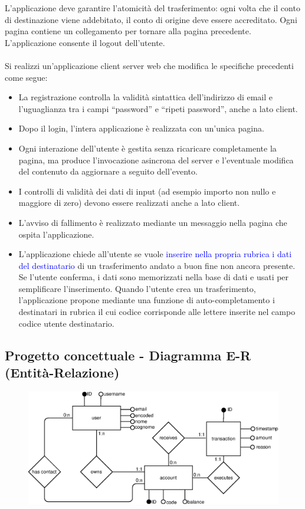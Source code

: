 \documentclass{article}
\begin{document}
L’applicazione deve garantire l’atomicità del trasferimento: ogni volta che il conto di
destinazione viene addebitato, il conto di origine deve essere accreditato. Ogni pagina
contiene un collegamento per tornare alla pagina precedente. L’applicazione consente il
logout dell’utente.
\\
\\
Si realizzi un’applicazione client server web che modifica le specifiche precedenti come segue:
\begin{itemize}
	\item La registrazione controlla la validità sintattica dell’indirizzo di email e l’uguaglianza tra
	i campi “password” e “ripeti password”, anche a lato client.
	\item Dopo il login, l’intera applicazione è realizzata con un’unica pagina.
	\item 	Ogni interazione dell’utente è gestita senza ricaricare completamente la pagina, ma
	produce l’invocazione asincrona del server e l’eventuale modifica del contenuto da
	aggiornare a seguito dell’evento.
	\item I controlli di validità dei dati di input (ad esempio importo non nullo e maggiore di zero)
	devono essere realizzati anche a lato client.
	\item L’avviso di fallimento è realizzato mediante un messaggio nella pagina che ospita
	l’applicazione.
	\item L’applicazione chiede all’utente se vuole  \textcolor{blue}{inserire nella propria rubrica i dati del
	destinatario} di un trasferimento andato a buon fine non ancora presente. Se l’utente
	conferma, i dati sono memorizzati nella base di dati e usati per semplificare
	l’inserimento. Quando l’utente crea un trasferimento, l’applicazione propone mediante
	una funzione di auto-completamento i destinatari in rubrica il cui codice corrisponde
	alle lettere inserite nel campo codice utente destinatario.
\end{itemize}

\subsection{Progetto concettuale - Diagramma E-R (Entità-Relazione)}\begin{figure}[H]
\centering
\includegraphics[width=1\textwidth]{assets/diagram.eps}
\end{figure}
\end{document}

